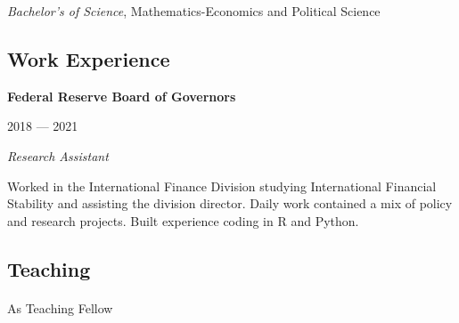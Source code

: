 \documentclass[
  letterpaper,
  DIV=11,
  numbers=noendperiod]{scrartcl}
\makeatletter
\let\oldparagraph\paragraph
\renewcommand{\paragraph}{
    \@ifstar
      \xxxParagraphStar
      \xxxParagraphNoStar
  }
\newcommand{\xxxParagraphStar}[1]{\oldparagraph*{#1}\mbox{}}
\newcommand{\xxxParagraphNoStar}[1]{\oldparagraph{#1}\mbox{}}
\makeatother
\begin{document}
\vspace{-6pt}\begin{minipage}{\linewidth}

\emph{Bachelor's of Science}, Mathematics-Economics and Political
Science

\end{minipage}

\subsection{Work
Experience}\vspace{-20pt}\noindent\makebox[\linewidth]{\rule{\textwidth}{0.5pt}}

\begin{minipage}{0.7\linewidth}

\textbf{Federal Reserve Board of Governors}

\end{minipage}\begin{minipage}{0.3\linewidth}\begin{flushright}

2018 --- 2021

\end{flushright}\end{minipage}

\vspace{-6pt}\begin{minipage}{\linewidth}

\emph{Research Assistant}

\end{minipage}

\vspace{-1pt}\begin{minipage}{\linewidth}

Worked in the International Finance Division studying International
Financial Stability and assisting the division director. Daily work
contained a mix of policy and research projects. Built experience coding
in R and Python.

\end{minipage}

\subsection{Teaching}\vspace{-20pt}\noindent\makebox[\linewidth]{\rule{\textwidth}{0.5pt}}

\paragraph{As Teaching Fellow}\label{as-teaching-fellow}
\end{document}
